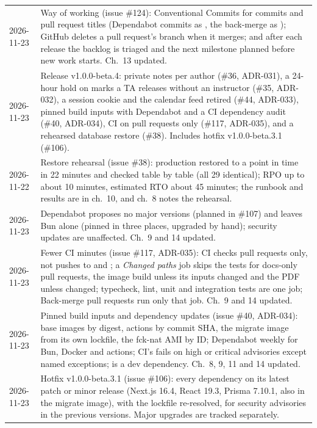 \begin{xltabular}{\linewidth}{@{}l L@{}}
  2026-11-23 & Way of working (issue \#124): Conventional Commits for commits and pull request titles (Dependabot commits as , the back-merge as ); GitHub deletes a pull request's branch when it merges; and after each release the backlog is triaged and the next milestone planned before new work starts. Ch.~13 updated.\\
  2026-11-23 & Release v1.0.0-beta.4: private notes per author (\#36, ADR-031), a 24-hour hold on marks a TA releases without an instructor (\#35, ADR-032), a  session cookie and the calendar feed retired (\#44, ADR-033), pinned build inputs with Dependabot and a CI dependency audit (\#40, ADR-034), CI on pull requests only (\#117, ADR-035), and a rehearsed database restore (\#38). Includes hotfix v1.0.0-beta.3.1 (\#106).\\
  2026-11-22 & Restore rehearsal (issue \#38): production restored to a point in time in 22 minutes and checked table by table (all 29 identical); RPO up to about 10 minutes, estimated RTO about 45 minutes; the runbook and results are in ch.~10, and ch.~8 notes the rehearsal.\\
  2026-11-23 & Dependabot proposes no major versions (planned in \#107) and leaves Bun alone (pinned in three places, upgraded by hand); security updates are unaffected. Ch.~9 and 14 updated.\\
  2026-11-23 & Fewer CI minutes (issue \#117, ADR-035): CI checks pull requests only, not pushes to  and ; a \emph{Changed paths} job skips the tests for docs-only pull requests, the image build unless its inputs changed and the PDF unless  changed; typecheck, lint, unit and integration tests are one job; Back-merge pull requests run only that job. Ch.~9 and 14 updated.\\
  2026-11-23 & Pinned build inputs and dependency updates (issue \#40, ADR-034): base images by digest, actions by commit SHA, the migrate image from its own lockfile, the fck-nat AMI by ID; Dependabot weekly for Bun, Docker and actions; CI's  fails on high or critical advisories except named exceptions;  is a dev dependency. Ch.~8, 9, 11 and 14 updated.\\
  2026-11-23 & Hotfix v1.0.0-beta.3.1 (issue \#106): every dependency on its latest patch or minor release (Next.js 16.4, React 19.3, Prisma 7.10.1, also in the migrate image), with the lockfile re-resolved, for security advisories in the previous versions. Major upgrades are tracked separately.\\

\end{xltabular}

